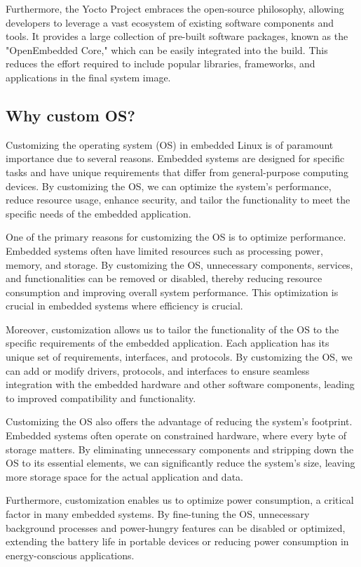\documentclass[
12pt,
oneside, 
onehalfspacing, 
nolistspacing, 
parskip, 
chapterinoneline, 
]{AASTCOMPUTER}
\begin{document}
Furthermore, the Yocto Project embraces the open-source philosophy, allowing developers to leverage a vast ecosystem of existing software components and tools. It provides a large collection of pre-built software packages, known as the "OpenEmbedded Core," which can be easily integrated into the build. This reduces the effort required to include popular libraries, frameworks, and applications in the final system image.

\subsection{Why custom OS?}
Customizing the operating system (OS) in embedded Linux is of paramount importance due to several reasons. Embedded systems are designed for specific tasks and have unique requirements that differ from general-purpose computing devices. By customizing the OS, we can optimize the system's performance, reduce resource usage, enhance security, and tailor the functionality to meet the specific needs of the embedded application.

One of the primary reasons for customizing the OS is to optimize performance. Embedded systems often have limited resources such as processing power, memory, and storage. By customizing the OS, unnecessary components, services, and functionalities can be removed or disabled, thereby reducing resource consumption and improving overall system performance. This optimization is crucial in embedded systems where efficiency is crucial.

Moreover, customization allows us to tailor the functionality of the OS to the specific requirements of the embedded application. Each application has its unique set of requirements, interfaces, and protocols. By customizing the OS, we can add or modify drivers, protocols, and interfaces to ensure seamless integration with the embedded hardware and other software components, leading to improved compatibility and functionality.

Customizing the OS also offers the advantage of reducing the system's footprint. Embedded systems often operate on constrained hardware, where every byte of storage matters. By eliminating unnecessary components and stripping down the OS to its essential elements, we can significantly reduce the system's size, leaving more storage space for the actual application and data.

Furthermore, customization enables us to optimize power consumption, a critical factor in many embedded systems. By fine-tuning the OS, unnecessary background processes and power-hungry features can be disabled or optimized, extending the battery life in portable devices or reducing power consumption in energy-conscious applications.
\end{document}
